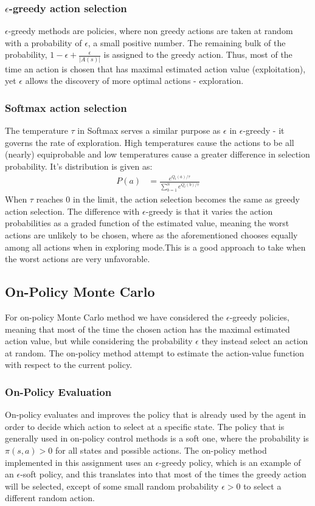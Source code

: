 \documentclass[paper=a4, fontsize=11pt]{scrartcl}
\numberwithin{equation}{section}		%
\numberwithin{figure}{section}			%
\numberwithin{table}{section}				%
\begin{document}
\subsubsection*{$\epsilon$-greedy action selection}
$\epsilon$-greedy methods are policies, where non greedy actions are taken at random with a probability of $\epsilon$, a small positive number. The remaining bulk of the probability, $1-\epsilon + \frac{\epsilon}{|A(s)|}$ is assigned to the greedy action. Thus, most of the time an action is chosen that has maximal estimated action value (exploitation), yet $\epsilon$ allows the discovery of more optimal actions - exploration.

\subsubsection*{Softmax action selection}
The temperature $\tau$ in Softmax serves a similar purpose as $\epsilon$ in $\epsilon$-greedy - it governs the rate of exploration. High temperatures cause the actions to be all (nearly) equiprobable and low temperatures cause a greater difference in selection probability. It's distribution is given as:
\begin{align}
P(a) &= \frac{e^{Q_t(a)/\tau}}{\sum_{b=1}^{n} e^{Q_t(b)/\tau}}
\end{align}
When $\tau$ reaches 0 in the limit, the action selection becomes the same as greedy action selection. The difference with $\epsilon$-greedy is that it varies the action probabilities as a graded function of the estimated value, meaning the worst actions are unlikely to be chosen, where as the aforementioned chooses equally among all actions when in exploring mode.This is a good approach to take when the worst actions are very unfavorable.

\subsection{\textbf {On-Policy Monte Carlo}}
For on-policy Monte Carlo method we have considered the $\epsilon$-greedy policies, meaning that most of the time the chosen action has the maximal estimated action value, but while considering the probability $\epsilon$ they instead select an action at random. The on-policy method attempt  to estimate the action-value function with respect to the current policy.

\subsubsection*{On-Policy Evaluation}
On-policy evaluates and improves the policy that is already used by the agent in order to decide which action to select at a specific state. The policy that is generally used in on-policy control methods is a soft one, where the probability is $\pi(s,a) > 0$ for all states and possible actions. The on-policy method implemented in this assignment uses an $\epsilon$-greedy policy, which is an example of an $\epsilon$-soft policy, and this translates into that most of the times the greedy action will be selected, except of some small random probability $\epsilon > 0$ to select a different random action.
\end{document}
